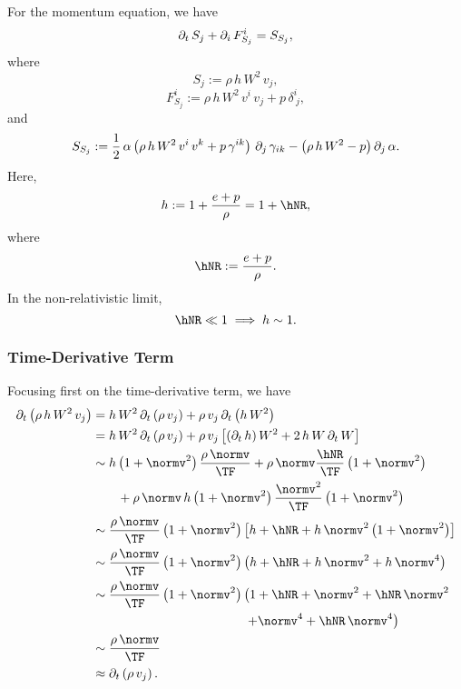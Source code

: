 For the momentum equation, we have
\begin{equation}
  \partial_{t}\,S_{j}+\partial_{i}\,F^{i}_{S_{j}}=S_{S_{j}},
\end{equation}
where
\begin{equation}
  S_{j}:=\rho\,h\,W^{2}\,v_{j},
\end{equation}
\begin{equation}
  F^{i}_{S_{j}}
  :=\rho\,h\,W^{2}\,v^{i}\,v_{j}+p\,\delta^{i}_{~j},
\end{equation}
and
\begin{equation}
  S_{S_{j}}
  :=\frac{1}{2}\,\alpha
  \left(\rho\,h\,W^{2}\,v^{i}\,v^{k}+p\,\gamma^{ik}\right)\,
  \partial_{j}\,\gamma_{ik}-\left(\rho\,h\,W^{2}-p\right)\partial_{j}\,\alpha.
\end{equation}
Here,
\begin{equation}
  h:=1+\frac{e+p}{\rho}=1+\hNR,
\end{equation}
where
\begin{equation}
  \hNR:=\frac{e+p}{\rho}.
\end{equation}
In the non-relativistic limit,
\begin{equation}
  \hNR\ll1\implies h\sim1.
\end{equation}

\subsubsection{Time-Derivative Term}
Focusing first on the time-derivative term, we have
\begin{align}
  \p_{t}\left(\rho\,h\,W^{2}\,v_{j}\right)
  &=h\,W^{2}\,\p_{t}\left(\rho\,v_{j}\right)
  +\rho\,v_{j}\,\p_{t}\left(h\,W^{2}\right) \\
  &=h\,W^{2}\,\p_{t}\left(\rho\,v_{j}\right)
  +\rho\,v_{j}\left[\left(\p_{t}\,h\right)W^{2}+2\,h\,W\,\p_{t}\,W\right] \\
  &\sim h\left(1+\normv^{2}\right)\frac{\rho\,\normv}{\TF}
  +\rho\,\normv\frac{\hNR}{\TF}\left(1+\normv^{2}\right) \notag \\
  &\hspace{2em}+\rho\,\normv\,h\left(1+\normv^{2}\right)
  \frac{\normv^{2}}{\TF}\left(1+\normv^{2}\right) \\
  &\sim\frac{\rho\,\normv}{\TF}\left(1+\normv^{2}\right)
  \left[h+\hNR+h\,\normv^{2}\left(1+\normv^{2}\right)\right] \\
  &\sim\frac{\rho\,\normv}{\TF}\left(1+\normv^{2}\right)
  \left(h+\hNR+h\,\normv^{2}+h\,\normv^{4}\right) \\
  &\sim\frac{\rho\,\normv}{\TF}\left(1+\normv^{2}\right)
  \left(1+\hNR+\normv^{2}+\hNR\,\normv^{2}\right. \notag \\
  &\left.\hspace{12em}+\normv^{4}+\hNR\,\normv^{4}\right) \\
  &\sim\frac{\rho\,\normv}{\TF} \\
  &\approx\p_{t}\left(\rho\,v_{j}\right).
  \label{NL.eq.SjT}
\end{align}


